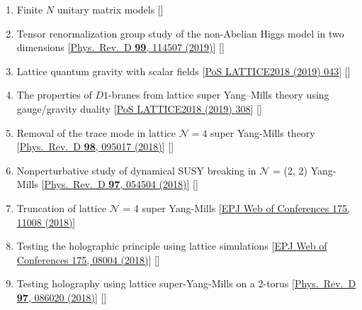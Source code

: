 \begin{enumerate}
 \item  Finite $N$ unitary matrix models [\textbf{\texttt{}}] 
  \item Tensor renormalization group study of the non-Abelian Higgs model in two dimensions [\href{https://journals.aps.org/prd/abstract/10.1103/PhysRevD.99.114507}{Phys.\ Rev.\ D {\bf 99}, 114507 (2019)}] [\texttt{\textbf{}}] 
 \item  Lattice quantum gravity with scalar fields [\href{https://pos.sissa.it/334/043}{PoS LATTICE2018 (2019) 043}] [\texttt{\textbf{}}] %
  \item  The properties of $D1$-branes from lattice super Yang--Mills theory using gauge/gravity duality [\href{https://pos.sissa.it/334/308}{PoS LATTICE2018 (2019) 308}]   [\texttt{\textbf{}}] %
  \item  Removal of the trace mode in lattice $\mathcal{N }= 4$ super Yang-Mills theory [\href{https://journals.aps.org/prd/abstract/10.1103/PhysRevD.98.095017}{Phys.\ Rev.\ D {\bf 98}, 095017 (2018)}] [\texttt{\textbf{\texttt{}}}]  
 \item Nonperturbative study of dynamical SUSY breaking in $\mathcal{N}$ = (2, 2) Yang-Mills [\href{https://journals.aps.org/prd/abstract/10.1103/PhysRevD.97.054504}{Phys.\ Rev.\ D {\bf 97}, 054504 (2018)}] [\texttt{\textbf{}}]  
 \item Truncation of lattice $\mathcal{N}$ = 4 super Yang-Mills [\href{https://doi.org/10.1051/epjconf/201817511008}{EPJ Web of Conferences 175, 11008 (2018)}] %
\item Testing the holographic principle using lattice simulations  [\href{https://doi.org/10.1051/epjconf/201817508004}{EPJ Web of Conferences 175, 08004 (2018)}] [\texttt{\textbf{}}] %
\item Testing holography using lattice super-Yang-Mills on a 2-torus [\href{https://journals.aps.org/prd/abstract/10.1103/PhysRevD.97.086020}{Phys.\ Rev.\ D {\bf 97}, 086020 (2018)}] [\texttt{\textbf{}}]
\end{enumerate}
